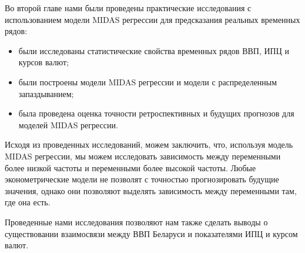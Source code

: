 \documentclass[a4paper, 12pt]{extarticle}
\numberwithin{equation}{subsection}
\begin{document}
	Во второй главе нами были проведены практические исследования с использованием модели MIDAS регрессии для предсказания реальных временных рядов:
	\begin{itemize}
		\item были исследованы статистические свойства временных рядов ВВП, ИПЦ и курсов валют;
		\item были построены модели MIDAS регрессии и модели с распределенным запаздыванием;
		\item была проведена оценка точности ретроспективных и будущих прогнозов для моделей MIDAS регрессии.
	\end{itemize} 
	Исходя из проведенных исследований, можем заключить, что, используя модель MIDAS регрессии, мы можем исследовать зависимость между переменными более низкой частоты и переменными более высокой частоты. Любые эконометрические модели не позволят с точностью прогнозировать будущие значения, однако они позволяют выделять зависимость между переменными там, где она есть.
	
	Проведенные нами исследования позволяют нам также сделать выводы о существовании взаимосвязи между ВВП Беларуси и показателями ИПЦ и курсом валют.
	\newpage
\end{document}
